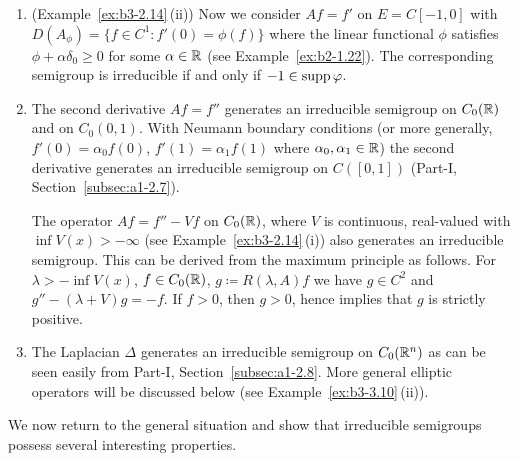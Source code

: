 \begin{examples}
\begin{enumerate}[\upshape (i), wide, labelindent=.25em]
	\item 
	(\cf Example~\ref{ex:b3-2.14}\,(ii)) Now we consider $Af = f'$ on $E = C[-1,0]$ with $D(A_{\phi}) = \{f \in C^1 \colon f'(0) = \phi(f)\}$ where the linear functional $\phi$ satisfies $\phi + \alpha\delta_{0} \geq 0$ for some $\alpha \in \mathbb{R}$ (see Example~\ref{ex:b2-1.22}).
	The corresponding semigroup is irreducible if and only if\/ $-1 \in \supp\phi$.
	
	\item 
	The second derivative $Af = f''$ generates an irreducible semigroup on $C_{0}(\mathbb{R})$ and on $C_{0}(0,1)$.
	With Neumann boundary conditions (or more generally, $f'(0) = \alpha_{0}f(0)$, $f'(1) = \alpha_{1}f(1)$ where $\alpha_{0}, \alpha_{1} \in \mathbb{R}$) the second derivative generates an irreducible semigroup on $C([0,1])$ (\cf Part-I, Section~\ref{subsec:a1-2.7}).
	
	The operator $Af = f'' - Vf$ on $C_{0}(\mathbb{R})$, where $V$ is continuous, real-valued with $\inf V(x) > -\infty$ (see Example~\ref{ex:b3-2.14}\,(i)) also generates an irreducible semigroup.
	This can be derived from the maximum principle as follows. 
    For $\lambda > -\inf V(x)$, $f \in C_{0}(\mathbb{R})$, $g \coloneq R(\lambda,A)f$ we have $g \in C^2$ and $g'' - (\lambda + V)g = -f$.
	If\/ $f > 0$, then $g > 0$, hence \textcite[Chap.I, Theorem~3]{protterweinberger:1967} implies that $g$ is strictly positive.
	
	\item 
	The Laplacian 
    $\Delta$ generates an irreducible semigroup on $C_{0}(\mathbb{R}^n)$ as can be seen easily from Part-I, Section~\ref{subsec:a1-2.8}.
	More general elliptic operators will be discussed below (see Example~\ref{ex:b3-3.10}\,(ii)).
\end{enumerate}
\end{examples}
We now return to the general situation and show that irreducible semigroups possess several interesting properties.
